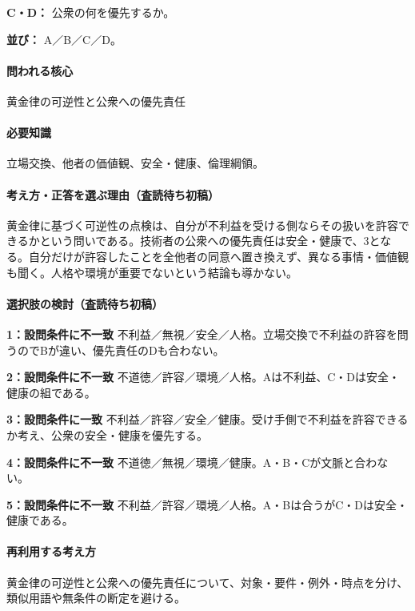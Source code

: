 \noindent\textbf{C・D：} 公衆の何を優先するか。\par

\noindent\textbf{並び：} A／B／C／D。\par

\paragraph{問われる核心} 黄金律の可逆性と公衆への優先責任

\paragraph{必要知識} 立場交換、他者の価値観、安全・健康、倫理綱領。

\paragraph{考え方・正答を選ぶ理由（査読待ち初稿）} 黄金律に基づく可逆性の点検は、自分が不利益を受ける側ならその扱いを許容できるかという問いである。技術者の公衆への優先責任は安全・健康で、3となる。自分だけが許容したことを全他者の同意へ置き換えず、異なる事情・価値観も聞く。人格や環境が重要でないという結論も導かない。

\paragraph{選択肢の検討（査読待ち初稿）}\mbox{}\par

\noindent\textbf{1：設問条件に不一致} 不利益／無視／安全／人格。立場交換で不利益の許容を問うのでBが違い、優先責任のDも合わない。\par

\noindent\textbf{2：設問条件に不一致} 不道徳／許容／環境／人格。Aは不利益、C・Dは安全・健康の組である。\par

\noindent\textbf{3：設問条件に一致} 不利益／許容／安全／健康。受け手側で不利益を許容できるか考え、公衆の安全・健康を優先する。\par

\noindent\textbf{4：設問条件に不一致} 不道徳／無視／環境／健康。A・B・Cが文脈と合わない。\par

\noindent\textbf{5：設問条件に不一致} 不利益／許容／環境／人格。A・Bは合うがC・Dは安全・健康である。\par

\paragraph{再利用する考え方} 黄金律の可逆性と公衆への優先責任について、対象・要件・例外・時点を分け、類似用語や無条件の断定を避ける。

